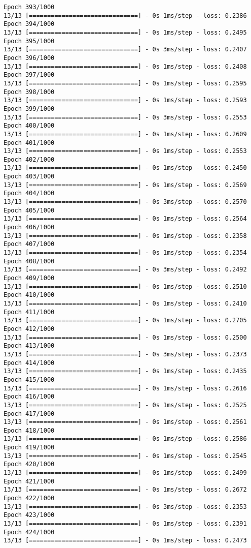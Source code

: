 \documentclass[11pt]{article}
\begin{document}
\begin{Verbatim}[commandchars=\\\{\}]
Epoch 393/1000
13/13 [==============================] - 0s 1ms/step - loss: 0.2386
Epoch 394/1000
13/13 [==============================] - 0s 1ms/step - loss: 0.2495
Epoch 395/1000
13/13 [==============================] - 0s 3ms/step - loss: 0.2407
Epoch 396/1000
13/13 [==============================] - 0s 1ms/step - loss: 0.2408
Epoch 397/1000
13/13 [==============================] - 0s 1ms/step - loss: 0.2595
Epoch 398/1000
13/13 [==============================] - 0s 1ms/step - loss: 0.2593
Epoch 399/1000
13/13 [==============================] - 0s 3ms/step - loss: 0.2553
Epoch 400/1000
13/13 [==============================] - 0s 1ms/step - loss: 0.2609
Epoch 401/1000
13/13 [==============================] - 0s 1ms/step - loss: 0.2553
Epoch 402/1000
13/13 [==============================] - 0s 1ms/step - loss: 0.2450
Epoch 403/1000
13/13 [==============================] - 0s 1ms/step - loss: 0.2569
Epoch 404/1000
13/13 [==============================] - 0s 3ms/step - loss: 0.2570
Epoch 405/1000
13/13 [==============================] - 0s 1ms/step - loss: 0.2564
Epoch 406/1000
13/13 [==============================] - 0s 1ms/step - loss: 0.2358
Epoch 407/1000
13/13 [==============================] - 0s 1ms/step - loss: 0.2354
Epoch 408/1000
13/13 [==============================] - 0s 3ms/step - loss: 0.2492
Epoch 409/1000
13/13 [==============================] - 0s 1ms/step - loss: 0.2510
Epoch 410/1000
13/13 [==============================] - 0s 1ms/step - loss: 0.2410
Epoch 411/1000
13/13 [==============================] - 0s 1ms/step - loss: 0.2705
Epoch 412/1000
13/13 [==============================] - 0s 1ms/step - loss: 0.2500
Epoch 413/1000
13/13 [==============================] - 0s 3ms/step - loss: 0.2373
Epoch 414/1000
13/13 [==============================] - 0s 1ms/step - loss: 0.2435
Epoch 415/1000
13/13 [==============================] - 0s 1ms/step - loss: 0.2616
Epoch 416/1000
13/13 [==============================] - 0s 1ms/step - loss: 0.2525
Epoch 417/1000
13/13 [==============================] - 0s 1ms/step - loss: 0.2561
Epoch 418/1000
13/13 [==============================] - 0s 1ms/step - loss: 0.2586
Epoch 419/1000
13/13 [==============================] - 0s 1ms/step - loss: 0.2545
Epoch 420/1000
13/13 [==============================] - 0s 1ms/step - loss: 0.2499
Epoch 421/1000
13/13 [==============================] - 0s 1ms/step - loss: 0.2672
Epoch 422/1000
13/13 [==============================] - 0s 3ms/step - loss: 0.2353
Epoch 423/1000
13/13 [==============================] - 0s 1ms/step - loss: 0.2391
Epoch 424/1000
13/13 [==============================] - 0s 1ms/step - loss: 0.2473

\end{Verbatim}
\end{document}
